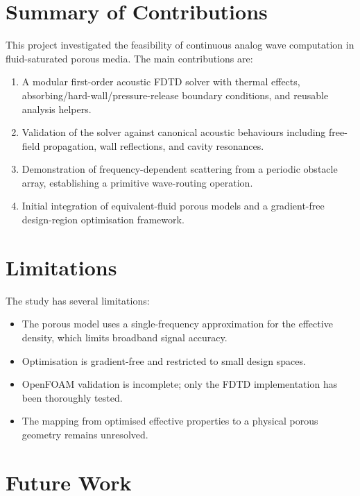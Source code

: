 
\section{Summary of Contributions}
\label{sec:contributions}

This project investigated the feasibility of continuous analog wave computation in fluid-saturated porous media. The main contributions are:
\begin{enumerate}
    \item A modular first-order acoustic FDTD solver with thermal effects, absorbing/hard-wall/pressure-release boundary conditions, and reusable analysis helpers.
    \item Validation of the solver against canonical acoustic behaviours including free-field propagation, wall reflections, and cavity resonances.
    \item Demonstration of frequency-dependent scattering from a periodic obstacle array, establishing a primitive wave-routing operation.
    \item Initial integration of equivalent-fluid porous models and a gradient-free design-region optimisation framework.
\end{enumerate}

\section{Limitations}
\label{sec:limitations}

The study has several limitations:
\begin{itemize}
    \item The porous model uses a single-frequency approximation for the effective density, which limits broadband signal accuracy.
    \item Optimisation is gradient-free and restricted to small design spaces.
    \item OpenFOAM validation is incomplete; only the FDTD implementation has been thoroughly tested.
    \item The mapping from optimised effective properties to a physical porous geometry remains unresolved.
\end{itemize}

\section{Future Work}
\label{sec:future}


